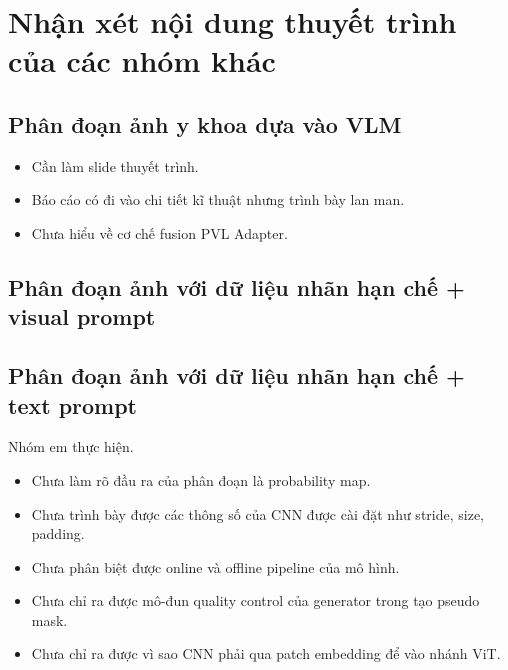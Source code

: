 \chapter{Nhận xét nội dung thuyết trình của các nhóm khác}
\label{Chapter7}
\setcounter{secnumdepth}{5}

\section*{Phân đoạn ảnh y khoa dựa vào VLM}

\begin{itemize}
    \item Cần làm slide thuyết trình.

    \item Báo cáo có đi vào chi tiết kĩ thuật nhưng trình bày lan man.

    \item Chưa hiểu về cơ chế fusion PVL Adapter.
\end{itemize}

\section*{Phân đoạn ảnh với dữ liệu nhãn hạn chế + visual prompt}

\section*{Phân đoạn ảnh với dữ liệu nhãn hạn chế + text prompt}

Nhóm em thực hiện.

\begin{itemize}
    \item Chưa làm rõ đầu ra của phân đoạn là probability map.

    \item Chưa trình bày được các thông số của CNN được cài đặt như stride, size, padding.

    \item Chưa phân biệt được online và offline pipeline của mô hình.

    \item Chưa chỉ ra được mô-đun quality control của generator trong tạo pseudo mask.

    \item Chưa chỉ ra được vì sao CNN phải qua patch embedding để vào nhánh ViT.
\end{itemize}

